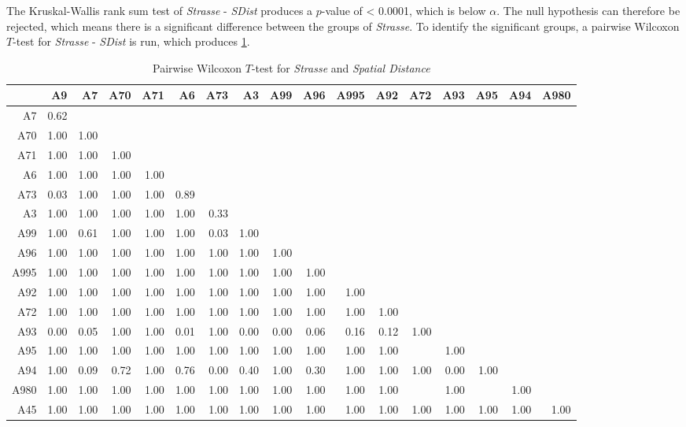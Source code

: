 The Kruskal-Wallis rank sum test of \textit{Strasse} - \textit{SDist} produces a $p$-value of < 0.0001, which is below $\alpha$. The null hypothesis can therefore be rejected, which means there is a significant difference between the groups of \textit{Strasse}. To identify the significant groups, a pairwise Wilcoxon $T$-test for \textit{Strasse} - \textit{SDist} is run, which produces \cref{tbl:wilcoxon_arbis_matched_Strasse_SDist}. 
\begin{table}[ht!]
	\tiny
	\setlength{\tabcolsep}{4pt}
	\centering
  \begin{tabular}{rrrrrrrrrrrrrrrrr}
    \hline
         & A9 & A7 & A70 & A71 & A6 & A73 & A3 & A99 & A96 & A995 & A92 & A72 & A93 & A95 & A94 & A980 \\ 
    \hline
    A7   & 0.62 &  &  &  &  &  &  &  &  &  &  &  &  &  &  &  \\ 
    A70  & 1.00 & 1.00 &  &  &  &  &  &  &  &  &  &  &  &  &  &  \\ 
    A71  & 1.00 & 1.00 & 1.00 &  &  &  &  &  &  &  &  &  &  &  &  &  \\ 
    A6   & 1.00 & 1.00 & 1.00 & 1.00 &  &  &  &  &  &  &  &  &  &  &  &  \\ 
    A73  & 0.03 & 1.00 & 1.00 & 1.00 & 0.89 &  &  &  &  &  &  &  &  &  &  &  \\ 
    A3   & 1.00 & 1.00 & 1.00 & 1.00 & 1.00 & 0.33 &  &  &  &  &  &  &  &  &  &  \\ 
    A99  & 1.00 & 0.61 & 1.00 & 1.00 & 1.00 & 0.03 & 1.00 &  &  &  &  &  &  &  &  &  \\ 
    A96  & 1.00 & 1.00 & 1.00 & 1.00 & 1.00 & 1.00 & 1.00 & 1.00 &  &  &  &  &  &  &  &  \\ 
    A995 & 1.00 & 1.00 & 1.00 & 1.00 & 1.00 & 1.00 & 1.00 & 1.00 & 1.00 &  &  &  &  &  &  &  \\ 
    A92  & 1.00 & 1.00 & 1.00 & 1.00 & 1.00 & 1.00 & 1.00 & 1.00 & 1.00 & 1.00 &  &  &  &  &  &  \\ 
    A72  & 1.00 & 1.00 & 1.00 & 1.00 & 1.00 & 1.00 & 1.00 & 1.00 & 1.00 & 1.00 & 1.00 &  &  &  &  &  \\ 
    A93  & 0.00 & 0.05 & 1.00 & 1.00 & 0.01 & 1.00 & 0.00 & 0.00 & 0.06 & 0.16 & 0.12 & 1.00 &  &  &  &  \\ 
    A95  & 1.00 & 1.00 & 1.00 & 1.00 & 1.00 & 1.00 & 1.00 & 1.00 & 1.00 & 1.00 & 1.00 &  & 1.00 &  &  &  \\ 
    A94  & 1.00 & 0.09 & 0.72 & 1.00 & 0.76 & 0.00 & 0.40 & 1.00 & 0.30 & 1.00 & 1.00 & 1.00 & 0.00 & 1.00 &  &  \\ 
    A980 & 1.00 & 1.00 & 1.00 & 1.00 & 1.00 & 1.00 & 1.00 & 1.00 & 1.00 & 1.00 & 1.00 &  & 1.00 &  & 1.00 &  \\ 
    A45  & 1.00 & 1.00 & 1.00 & 1.00 & 1.00 & 1.00 & 1.00 & 1.00 & 1.00 & 1.00 & 1.00 & 1.00 & 1.00 & 1.00 & 1.00 & 1.00 \\ 
    \hline
  \end{tabular}
	\caption{Pairwise Wilcoxon $T$-test for \textit{Strasse} and \textit{Spatial Distance}}
	\label{tbl:wilcoxon_arbis_matched_Strasse_SDist}
\end{table}

